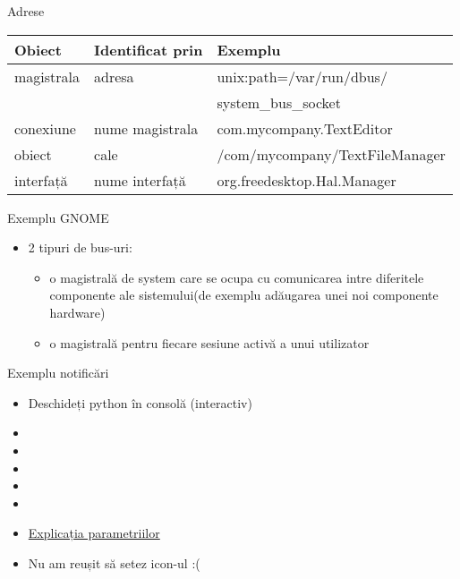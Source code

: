 \documentclass{beamer}
\begin{document}
\begin{frame}{Adrese}
  \begin{tabular}{ | l | l | l | }
    \hline
    Obiect & Identificat prin & Exemplu \\ \hline
    magistrala & adresa & unix:path=/var/run/dbus/\\
    & & system\_bus\_socket \\ \hline
    conexiune & nume magistrala & com.mycompany.TextEditor \\ \hline
    obiect & cale & /com/mycompany/TextFileManager \\ \hline
    interfață & nume interfață & org.freedesktop.Hal.Manager \\ \hline
    \hline
  \end{tabular}
\end{frame}

\begin{frame}{Exemplu GNOME}
\begin{itemize}
\item 2 tipuri de bus-uri:
	\begin{itemize}
		\item o magistrală de system care se ocupa cu comunicarea intre diferitele componente ale sistemului(de exemplu adăugarea unei noi componente hardware)
		\item \pause o magistrală pentru fiecare sesiune activă a unui utilizator
	\end{itemize}
\end{itemize}
\end{frame}

\begin{frame}{Exemplu notificări}
\begin{itemize}
	\item Deschideți python în consolă (interactiv)
	\item {}
	\item {}
	\item {}
	\item {}
	\item {}
	\item \pause \href{http://www.galago-project.org/specs/notification/0.9/x408.html}{Explicația parametriilor}
	\item \pause Nu am reușit să setez icon-ul :(
\end{itemize}
\end{frame}
\end{document}
